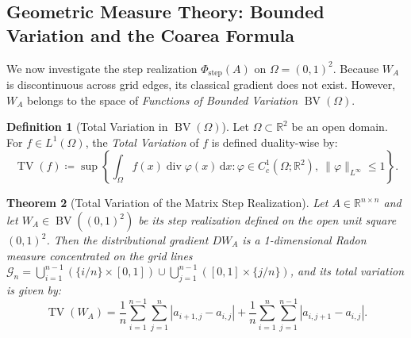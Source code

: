 \documentclass[11pt,a4paper,reqno]{amsart}
\newtheorem{theorem}{Theorem}[section]
\theoremstyle{definition}
\newtheorem{definition}[theorem]{Definition}
\numberwithin{equation}{section}
\newcommand{\R}{\mathbb{R}}
\newcommand{\BV}{\operatorname{BV}}
\newcommand{\TV}{\operatorname{TV}}
\newcommand{\dif}{\,\mathrm{d}}
\begin{document}
\subsection{Geometric Measure Theory: Bounded Variation and the Coarea Formula}
\label{subsec:coarea}

We now investigate the step realization $\Phi_{\mathrm{step}}(A)$ on $\Omega = (0, 1)^2$. Because $W_A$ is discontinuous across grid edges, its classical gradient does not exist. However, $W_A$ belongs to the space of \emph{Functions of Bounded Variation} $\BV(\Omega)$.

\begin{definition}[Total Variation in $\BV(\Omega)$]
Let $\Omega \subset \R^2$ be an open domain. For $f \in L^1(\Omega)$, the \emph{Total Variation} of $f$ is defined duality-wise by:
\begin{equation}
    \TV(f) \coloneqq \sup \left\{ \int_\Omega f(x) \operatorname{div} \varphi(x) \dif x \colon \varphi \in C_c^1(\Omega; \R^2), \ \|\varphi\|_{L^\infty} \le 1 \right\}.
\end{equation}
\end{definition}

\begin{theorem}[Total Variation of the Matrix Step Realization]
\label{thm:tv_matrix}
Let $A \in \R^{n \times n}$ and let $W_A \in \BV((0,1)^2)$ be its step realization defined on the open unit square $(0, 1)^2$. Then the distributional gradient $D W_A$ is a 1-dimensional Radon measure concentrated on the grid lines $\mathcal{G}_n = \bigcup_{i=1}^{n-1} (\{i/n\} \times [0,1]) \cup \bigcup_{j=1}^{n-1} ([0,1] \times \{j/n\})$, and its total variation is given by:
\begin{equation}
    \label{eq:tv_formula}
    \TV(W_A) = \frac{1}{n} \sum_{i=1}^{n-1} \sum_{j=1}^n |a_{i+1, j} - a_{i, j}| + \frac{1}{n} \sum_{i=1}^n \sum_{j=1}^{n-1} |a_{i, j+1} - a_{i, j}|.
\end{equation}
\end{theorem}
\end{document}

